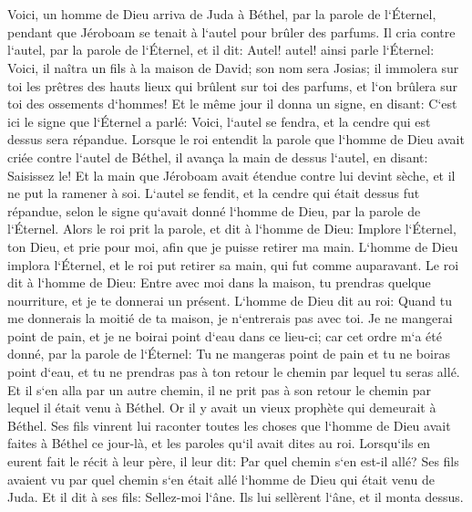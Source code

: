 \chapter{}

\verse Voici, un homme de Dieu arriva de Juda à Béthel, par la parole de l`Éternel, pendant que Jéroboam se tenait à l`autel pour brûler des parfums. 
\verse Il cria contre l`autel, par la parole de l`Éternel, et il dit: Autel! autel! ainsi parle l`Éternel: Voici, il naîtra un fils à la maison de David; son nom sera Josias; il immolera sur toi les prêtres des hauts lieux qui brûlent sur toi des parfums, et l`on brûlera sur toi des ossements d`hommes! 
\verse Et le même jour il donna un signe, en disant: C`est ici le signe que l`Éternel a parlé: Voici, l`autel se fendra, et la cendre qui est dessus sera répandue. 
\verse Lorsque le roi entendit la parole que l`homme de Dieu avait criée contre l`autel de Béthel, il avança la main de dessus l`autel, en disant: Saisissez le! Et la main que Jéroboam avait étendue contre lui devint sèche, et il ne put la ramener à soi. 
\verse L`autel se fendit, et la cendre qui était dessus fut répandue, selon le signe qu`avait donné l`homme de Dieu, par la parole de l`Éternel. 
\verse Alors le roi prit la parole, et dit à l`homme de Dieu: Implore l`Éternel, ton Dieu, et prie pour moi, afin que je puisse retirer ma main. L`homme de Dieu implora l`Éternel, et le roi put retirer sa main, qui fut comme auparavant. 
\verse Le roi dit à l`homme de Dieu: Entre avec moi dans la maison, tu prendras quelque nourriture, et je te donnerai un présent. 
\verse L`homme de Dieu dit au roi: Quand tu me donnerais la moitié de ta maison, je n`entrerais pas avec toi. Je ne mangerai point de pain, et je ne boirai point d`eau dans ce lieu-ci; 
\verse car cet ordre m`a été donné, par la parole de l`Éternel: Tu ne mangeras point de pain et tu ne boiras point d`eau, et tu ne prendras pas à ton retour le chemin par lequel tu seras allé. 
\verse Et il s`en alla par un autre chemin, il ne prit pas à son retour le chemin par lequel il était venu à Béthel. 
\verse Or il y avait un vieux prophète qui demeurait à Béthel. Ses fils vinrent lui raconter toutes les choses que l`homme de Dieu avait faites à Béthel ce jour-là, et les paroles qu`il avait dites au roi. Lorsqu`ils en eurent fait le récit à leur père, 
\verse il leur dit: Par quel chemin s`en est-il allé? Ses fils avaient vu par quel chemin s`en était allé l`homme de Dieu qui était venu de Juda. 
\verse Et il dit à ses fils: Sellez-moi l`âne. Ils lui sellèrent l`âne, et il monta dessus. 
